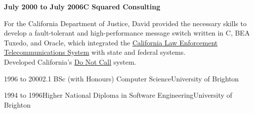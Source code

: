 \documentclass[a4paper,12pt]{article}
\newcommand{\head}[1]{\needspace{6em}\begin{center}{\large{\textbf{\sc{#1}}}}\nopagebreak\end{center}}
\newcommand{\jobheld}[2]{\textbf{#1\hfill #2}\nopagebreak}
\newcommand{\tab}{\hspace{2em}}
\newcommand{\education}[3]{#1\tab#2\hfill#3}
\begin{document}
\jobheld{July 2000 to July 2006}{C Squared Consulting}

For the California Department of Justice, David provided the necessary skills to develop a fault-tolerant and high-performance message switch written in C, BEA Tuxedo, and Oracle, which integrated the \href{http://definitions.uslegal.com/c/clets/}{California Law Enforcement Telecommunications System} with state and federal systems.\\

Developed California's \href{http://www.sfgate.com/cgi-bin/article.cgi?f=/c/a/2003/03/31/MN5478.DTL}{Do Not Call} system.\\

\head{Education}

\education{1996 to 2000}{2.1 BSc (with Honours) Computer Science}{University of Brighton}

\education{1994 to 1996}{Higher National Diploma in Software Engineering}{University of Brighton}
\end{document}
